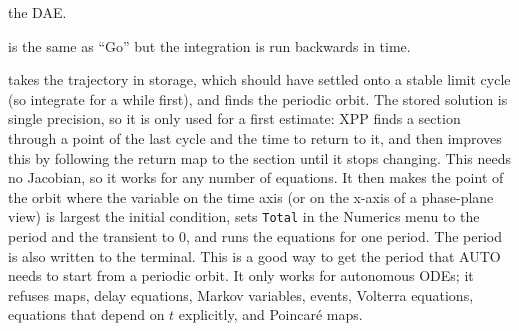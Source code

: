 \documentclass{article}
\begin{document}
\begin{description}
\begin{description}
the DAE.
\item[(B)ackward] is the same as ``Go'' but the integration is run
backwards in time.
\item[(P)eriodic] takes the trajectory in storage, which should have settled
onto a stable limit cycle (so integrate for a while first), and finds the periodic
orbit.  The stored solution is single precision, so it is only used for a first
estimate: XPP finds a section through a point of the last cycle and the time to
return to it, and then improves this by following the return map to the section
until it stops changing.  This needs no Jacobian, so it works for any number of
equations.  It then makes the point of the orbit where the variable on the
time axis (or on the x-axis of a phase-plane view) is largest the initial
condition, sets {\tt Total} in the Numerics menu to the period and the transient
to 0, and runs the equations for one period.  The period is also written to the
terminal.  This is a good way to get the period that AUTO needs to start from a
periodic orbit.  It only works for autonomous ODEs; it refuses maps, delay
equations, Markov variables, events, Volterra equations, equations that depend on
$t$ explicitly, and Poincar\'e maps.
  

\end{description}
\end{description}
\end{document}
